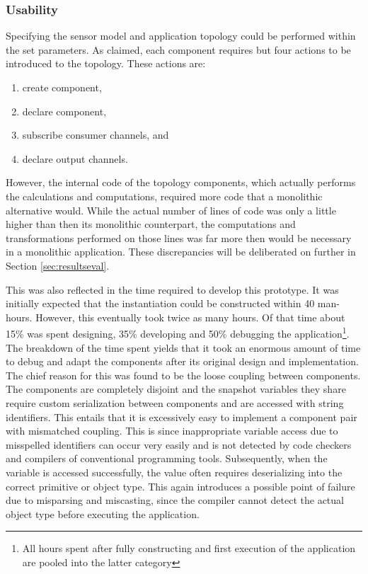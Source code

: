 \subsubsection{Usability}
Specifying the sensor model and application topology could be performed within the set parameters. As claimed, each component requires but four actions to be introduced to the topology. These actions are:
\begin{enumerate}
\nospace
\item create component,
\item declare component,
\item subscribe consumer channels, and
\item declare output channels.
\end{enumerate}
However, the internal code of the topology components, which actually performs the calculations and computations, required more code that a monolithic alternative would. While the actual number of lines of code was only a little higher than then its monolithic counterpart, the computations and transformations performed on those lines was far more then would be necessary in a monolithic application. These discrepancies will be deliberated on further in Section \ref{sec:resultseval}.

This was also reflected in the time required to develop this prototype. It was initially expected that the instantiation could be constructed within 40 man-hours. However, this eventually took twice as many hours. Of that time about 15\% was spent designing, 35\% developing and 50\% debugging the application\footnote{All hours spent after fully constructing and first execution of the application are pooled into the latter category}. The breakdown of the time spent yields that it took an enormous amount of time to debug and adapt the components after its original design and implementation. The chief reason for this was found to be the loose coupling between components. The components are completely disjoint and the snapshot variables they share require custom serialization between components and are accessed with string identifiers. This entails that it is excessively easy to implement a component pair with mismatched coupling. This is since inappropriate variable access due to misspelled identifiers can occur very easily and is not detected by code checkers and compilers of conventional programming tools. Subsequently, when the variable is accessed successfully, the value often requires deserializing into the correct primitive or object type. This again introduces a possible point of failure due to misparsing and miscasting, since the compiler cannot detect the actual object type before executing the application.

